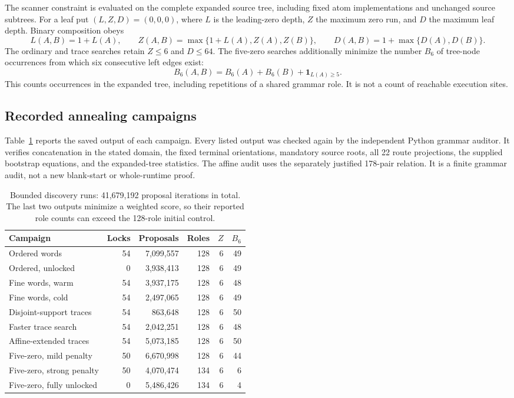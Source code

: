 The scanner constraint is evaluated on the complete expanded source
tree, including fixed atom implementations and unchanged source
subtrees.  For a leaf put $(L,Z,D)=(0,0,0)$, where $L$ is the leading-zero
depth, $Z$ the maximum zero run, and $D$ the maximum leaf depth.  Binary
composition obeys
\[
 L(A,B)=1+L(A),\qquad
 Z(A,B)=\max\{1+L(A),Z(A),Z(B)\},\qquad
 D(A,B)=1+\max\{D(A),D(B)\}.
\]
The ordinary and trace searches retain $Z\leq6$ and $D\leq64$.  The
five-zero searches additionally minimize the number $B_6$ of tree-node
occurrences from which six consecutive left edges exist:
\[
 B_6(A,B)=B_6(A)+B_6(B)+\mathbf 1_{L(A)\geq5}.
\]
This counts occurrences in the expanded tree, including repetitions of a
shared grammar role.  It is not a count of reachable execution sites.

\subsection{Recorded annealing campaigns}

Table~\ref{tab:grammar-campaigns} reports the saved output of each
campaign.  Every listed output was checked again by the independent
Python grammar auditor.  It verifies concatenation in the stated domain,
the fixed terminal orientations, mandatory source roots, all 22 route
projections, the supplied bootstrap equations, and the expanded-tree
statistics.  The affine audit uses the separately justified 178-pair
relation.  It is a finite grammar audit, not a new blank-start or
whole-runtime proof.

\begin{table}[htbp]
\centering\small
\begin{tabularx}{\textwidth}{@{}Xrrrrr@{}}
\toprule
Campaign & Locks & Proposals & Roles & $Z$ & $B_6$ \\
\midrule
Ordered words & 54 & 7,099,557 & 128 & 6 & 49 \\
Ordered, unlocked & 0 & 3,938,413 & 128 & 6 & 49 \\
Fine words, warm & 54 & 3,937,175 & 128 & 6 & 48 \\
Fine words, cold & 54 & 2,497,065 & 128 & 6 & 49 \\
Disjoint-support traces & 54 & 863,648 & 128 & 6 & 50 \\
Faster trace search & 54 & 2,042,251 & 128 & 6 & 48 \\
Affine-extended traces & 54 & 5,073,185 & 128 & 6 & 50 \\
Five-zero, mild penalty & 50 & 6,670,998 & 128 & 6 & 44 \\
Five-zero, strong penalty & 50 & 4,070,474 & 134 & 6 & 6 \\
Five-zero, fully unlocked & 0 & 5,486,426 & 134 & 6 & 4 \\
\bottomrule
\end{tabularx}
\caption{Bounded discovery runs: 41,679,192 proposal iterations in total.
The last two outputs minimize a weighted score, so their reported role
counts can exceed the 128-role initial control.}
\label{tab:grammar-campaigns}
\end{table}


